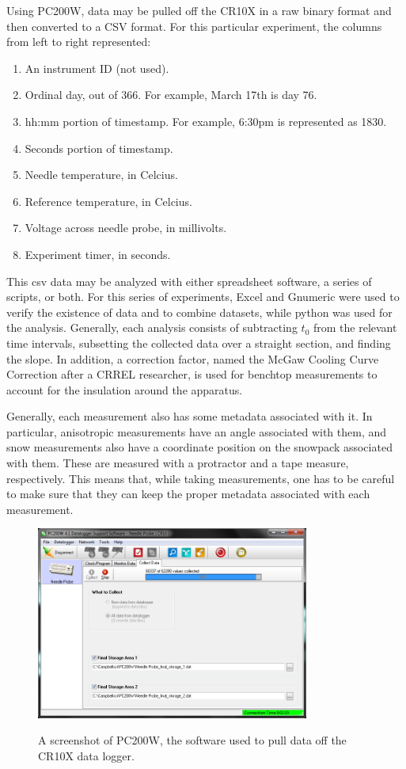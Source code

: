 Using PC200W, data may be pulled off the CR10X in a raw binary format and then
converted to a CSV format. For this particular experiment, the columns from left
to right represented:

\begin{enumerate}
\item An instrument ID (not used).
\item Ordinal day, out of 366. For example, March 17th is day 76.
\item hh:mm portion of timestamp. For example, 6:30pm is represented as 1830.
\item Seconds portion of timestamp.
\item Needle temperature, in Celcius.
\item Reference temperature, in Celcius.
\item Voltage across needle probe, in millivolts.
\item Experiment timer, in seconds.
\end{enumerate}

This csv data may be analyzed with either spreadsheet software, a series of
scripts, or both. For this series of experiments, Excel and Gnumeric were used
to verify the existence of data and to combine datasets, while python was used
for the analysis.  Generally, each analysis consists of subtracting \(t_0\)
from the relevant time intervals, subsetting the collected data over a straight
section, and finding the slope.  In addition, a correction factor, named the
McGaw Cooling Curve Correction after a CRREL researcher, is used for benchtop
measurements to account for the insulation around the apparatus.

Generally, each measurement also has some metadata associated with it. In
particular, anisotropic measurements have an angle associated with them, and
snow measurements also have a coordinate position on the snowpack associated
with them. These are measured with a protractor and a tape measure,
respectively. This means that, while taking measurements, one has to be careful
to make sure that they can keep the proper metadata associated with each
measurement.

\begin{figure}[h]
\centering
\includegraphics[width=0.8\textwidth]{fig/pc200w.png}
\label{fig:pc200w}
\caption{A screenshot of PC200W, the software used to pull data off the CR10X data logger.}
\end{figure}

